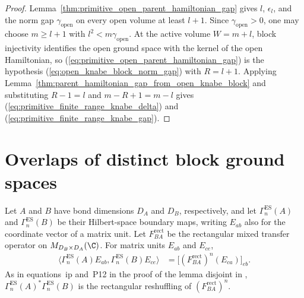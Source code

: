 \begin{proof}
    \leanok
    Lemma~\ref{thm:primitive_open_parent_hamiltonian_gap} gives $l$,
    $\epsilon_l$, and the norm gap $\gamma_{\mathrm{open}}$ on every open
    volume at least $l+1$.  Since $\gamma_{\mathrm{open}}>0$, one may choose
    $m\geq l+1$ with $l^2<m\gamma_{\mathrm{open}}$.  At the active volume
    $W=m+l$, block injectivity identifies the open ground space with the kernel
    of the open Hamiltonian, so
    (\ref{eq:primitive_open_parent_hamiltonian_gap}) is the hypothesis
    (\ref{eq:open_knabe_block_norm_gap}) with $R=l+1$.  Applying
    Lemma~\ref{thm:parent_hamiltonian_gap_from_open_knabe_block} and
    substituting $R-1=l$ and $m-R+1=m-l$ gives
    (\ref{eq:primitive_finite_range_knabe_delta}) and
    (\ref{eq:primitive_finite_range_knabe_gap}).
\end{proof}

\section{Overlaps of distinct block ground spaces}

\begin{lemma}
    \label{thm:mixed_boundary_gram_identity}
    \leanok
    Let $A$ and $B$ have bond dimensions $D_A$ and $D_B$, respectively,
    and let $\Gamma_n^{\mathrm{ES}}(A)$ and $\Gamma_n^{\mathrm{ES}}(B)$ be
    their Hilbert-space boundary maps, writing $E_{ab}$ also for the
    coordinate vector of a matrix unit. Let $F_{BA}^{\mathrm{rect}}$ be the
    rectangular mixed transfer operator on $M_{D_B\times D_A}(\C)$. For
    matrix units $E_{ab}$ and $E_{ce}$,
    \begin{align}
        \langle\Gamma_n^{\mathrm{ES}}(A)E_{ab},\Gamma_n^{\mathrm{ES}}(B)E_{ce}\rangle
         & =\bigl[(F_{BA}^{\mathrm{rect}})^n(E_{ca})\bigr]_{eb}.
    \end{align}
    As in equations~\textup{ip} and~\textup{P12} in the proof of the lemma
    \textup{disjoint} in \cite{Nachtergaele1996Spectral},
    $\Gamma_n^{\mathrm{ES}}(A)^*\Gamma_n^{\mathrm{ES}}(B)$ is the rectangular
    reshuffling of $(F_{BA}^{\mathrm{rect}})^n$.
\end{lemma}

